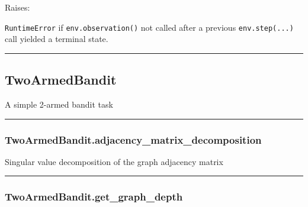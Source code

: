 Raises:

\texttt{RuntimeError} if \texttt{env.observation()} not called after a
previous \texttt{env.step(...)} call yielded a terminal state.

\begin{center}\rule{0.5\linewidth}{\linethickness}\end{center}

\subsection{TwoArmedBandit}\label{twoarmedbandit}

\begin{Shaded}
\begin{Highlighting}[]
\end{Highlighting}
\end{Shaded}

A simple 2-armed bandit task

\begin{center}\rule{0.5\linewidth}{\linethickness}\end{center}

\subsubsection{TwoArmedBandit.adjacency\_matrix\_decomposition}\label{twoarmedbandit.adjacency_matrix_decomposition}

\begin{Shaded}
\begin{Highlighting}[]
\NormalTok{)}
\end{Highlighting}
\end{Shaded}

Singular value decomposition of the graph adjacency matrix

\begin{center}\rule{0.5\linewidth}{\linethickness}\end{center}

\subsubsection{TwoArmedBandit.get\_graph\_depth}\label{twoarmedbandit.get_graph_depth}

\begin{Shaded}
\begin{Highlighting}[]
\NormalTok{)}
\end{Highlighting}
\end{Shaded}

